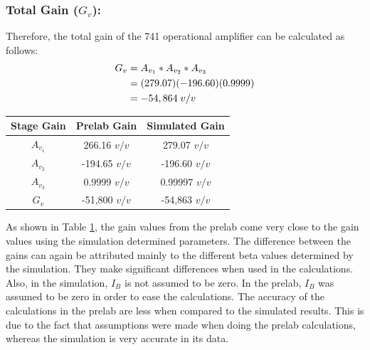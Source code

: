 \documentclass{article}
\begin{document}
	\subsubsection*{Total Gain ($G_v$):}
	Therefore, the total gain of the 741 operational amplifier can be calculated as follows:
	\begin{align*}
		G_v &= A_{v_1} * A_{v_2} * A_{v_3}\\
		&= (279.07)(-196.60)(0.9999)\\
		&= -54,864 \hspace{1mm} v/v
	\end{align*}
	\begin{table}[!ht]
		\centering
		\begin{tabular}{|c|c|c|}
			\hline
			Stage Gain & Prelab Gain & Simulated Gain\\
			\hline\hline
			$A_{v_1}$ & 266.16 $v/v$ & 279.07 $v/v$\\
			\hline
			$A_{v_2}$ & -194.65 $v/v$ & -196.60 $v/v$\\
			\hline
			$A_{v_3}$ & 0.9999 $v/v$ & 0.99997 $v/v$\\
			\hline
			$G_v$ & -51,800 $v/v$ & -54,863 $v/v$\\
			\hline
		\end{tabular}
		\label{t:4}
	\end{table}
	As shown in Table \ref{t:4}, the gain values from the prelab come very close to the gain values using the simulation determined parameters.
	The difference between the gains can again be attributed mainly to the different beta values determined by the simulation.
	They make significant differences when used in the calculations. 
	Also, in the simulation, $I_B$ is not assumed to be zero.
	In the prelab, $I_B$ was assumed to be zero in order to ease the calculations. 
	The accuracy of the calculations in the prelab are less when compared to the simulated results.
	This is due to the fact that assumptions were made when doing the prelab calculations, whereas the simulation is very accurate in its data.
	
	\pagebreak
\end{document}
